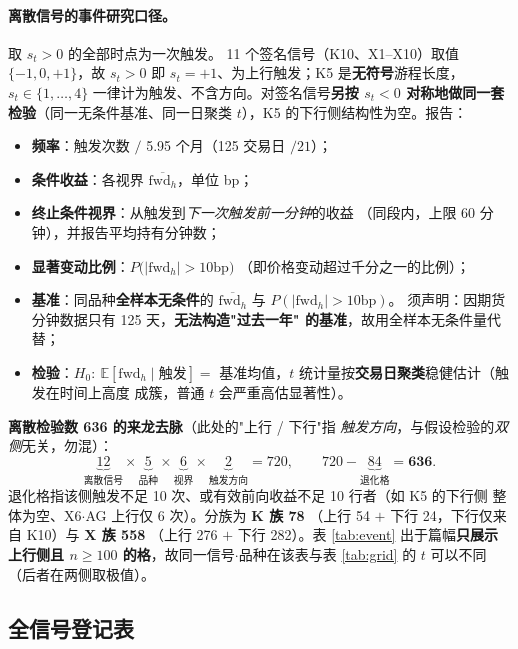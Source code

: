 \documentclass[11pt, a4paper]{ctexart}
\begin{document}
\paragraph{离散信号的事件研究口径。}取 $s_t>0$ 的全部时点为一次触发。
11 个签名信号（K10、X1--X10）取值 $\{-1,0,+1\}$，故 $s_t>0$ 即
$s_t=+1$、为上行触发；K5 是\textbf{无符号}游程长度，$s_t\in\{1,\dots,4\}$
一律计为触发、不含方向。对签名信号\textbf{另按 $s_t<0$ 对称地做同一套
检验}（同一无条件基准、同一日聚类 $t$），K5 的下行侧结构性为空。报告：
\begin{itemize}
\item \textbf{频率}：触发次数 $/$ 5.95 个月（125 交易日 $/21$）；
\item \textbf{条件收益}：各视界 $\overline{\mathrm{fwd}_{h}}$，单位 bp；
\item \textbf{终止条件视界}：从触发到\emph{下一次触发前一分钟}的收益
  （同段内，上限 60 分钟），并报告平均持有分钟数；
\item \textbf{显著变动比例}：$P\big(|\mathrm{fwd}_{h}| > 10\text{bp}\big)$
  （即价格变动超过千分之一的比例）；
\item \textbf{基准}：同品种\textbf{全样本无条件}的
  $\overline{\mathrm{fwd}_h}$ 与 $P(|\mathrm{fwd}_h|>10\text{bp})$。
  须声明：因期货分钟数据只有 125 天，\textbf{无法构造"过去一年"
  的基准}，故用全样本无条件量代替；
\item \textbf{检验}：$H_0:\ \mathbb{E}[\mathrm{fwd}_h\mid \text{触发}]=$
  基准均值，$t$ 统计量按\textbf{交易日聚类}稳健估计（触发在时间上高度
  成簇，普通 $t$ 会严重高估显著性）。
\end{itemize}

\noindent\textbf{离散检验数 636 的来龙去脉}（此处的"上行 / 下行"指
\emph{触发方向}，与假设检验的\emph{双侧}无关，勿混）：
\[
\underbrace{12}_{\text{离散信号}}\times
\underbrace{5}_{\text{品种}}\times
\underbrace{6}_{\text{视界}}\times
\underbrace{2}_{\text{触发方向}} = 720,\qquad
720 - \underbrace{84}_{\text{退化格}} = \mathbf{636}.
\]
退化格指该侧触发不足 10 次、或有效前向收益不足 10 行者（如 K5 的下行侧
整体为空、X6$\cdot$AG 上行仅 6 次）。分族为 \textbf{K 族 78}
（上行 54 $+$ 下行 24，下行仅来自 K10）与 \textbf{X 族 558}
（上行 276 $+$ 下行 282）。表 \ref{tab:event} 出于篇幅\textbf{只展示
上行侧且 $n\ge100$ 的格}，故同一信号$\cdot$品种在该表与表
\ref{tab:grid} 的 $t$ 可以不同（后者在两侧取极值）。

\subsection{全信号登记表}
\end{document}

